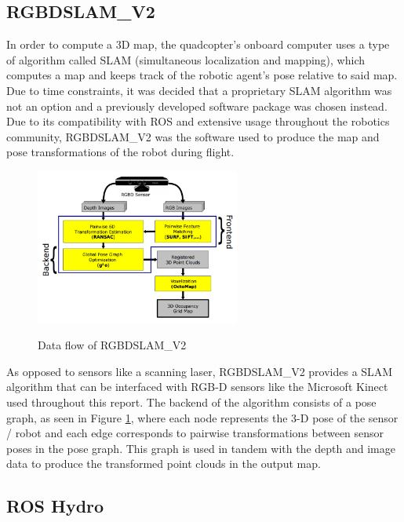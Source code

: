 \documentclass[letterpaper, oneside, 10pt]{report}
\begin{document}
\subsection{RGBDSLAM\_V2}
\noindent In order to compute a 3D map, the quadcopter's onboard computer uses a type of algorithm called SLAM (simultaneous localization and mapping), which computes a map and keeps track of the robotic agent's pose relative to said map. Due to time constraints, it was decided that a proprietary SLAM algorithm was not an option and a previously developed software package was chosen instead. Due to its compatibility with ROS and extensive usage throughout the robotics community, RGBDSLAM\_V2 \cite{endres2012evaluation} was the software used to produce the map and pose transformations of the robot during flight.

\begin{figure}[h!]
 \caption{Data flow of RGBDSLAM\_V2 \cite{endres2012evaluation}}
 \centering
   \includegraphics[width=0.6\textwidth]{images/rgbdslam}
 \label{fig: rgbdslam.}
\end{figure}

As opposed to sensors like a scanning laser, RGBDSLAM\_V2 provides a SLAM algorithm that can be interfaced with RGB-D sensors like the Microsoft Kinect used throughout this report. The backend of the algorithm consists of a pose graph, as seen in Figure \ref{fig: rgbdslam.}, where each node represents the 3-D pose of the sensor / robot and each edge corresponds to pairwise transformations between sensor poses in the pose graph. This graph is used in tandem with the depth and image data to produce the transformed point clouds in the output map.

\subsection{ROS Hydro}
\end{document}
